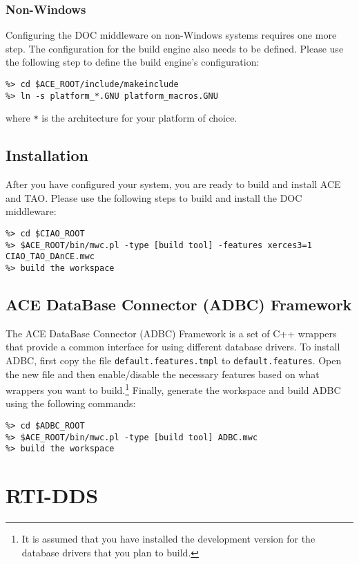 \subsubsection{Non-Windows}
Configuring the DOC middleware on non-Windows systems requires one more 
step. The configuration for the build engine also needs to be defined. 
Please use the following step to define the build engine's configuration:
\begin{lstlisting}
%> cd $ACE_ROOT/include/makeinclude
%> ln -s platform_*.GNU platform_macros.GNU
\end{lstlisting}
where \texttt{*} is the architecture for your platform of choice.

\subsection{Installation}

After you have configured your system, you are ready to build and 
install ACE and TAO. Please use the following steps to build and 
install the DOC middleware:
\begin{lstlisting}
%> cd $CIAO_ROOT
%> $ACE_ROOT/bin/mwc.pl -type [build tool] -features xerces3=1 CIAO_TAO_DAnCE.mwc
%> build the workspace
\end{lstlisting}

\subsection{ACE DataBase Connector (ADBC) Framework}
\label{sec:thirdparty-adbc}

The ACE DataBase Connector (ADBC) Framework is a set of C++ wrappers 
that provide a common interface for using different database drivers.
To install ADBC, first copy the file \texttt{default.features.tmpl} to
\texttt{default.features}. Open the new file and then enable/disable
the necessary features based on what wrappers you want to 
build.\footnote{It is assumed that you have installed the development
version for the database drivers that you plan to build.} Finally,
generate the workspace and build ADBC using the following commands:
\begin{lstlisting}
%> cd $ADBC_ROOT
%> $ACE_ROOT/bin/mwc.pl -type [build tool] ADBC.mwc
%> build the workspace
\end{lstlisting}
 
\section{RTI-DDS}
\label{sec:thirdparty-rtidds}

